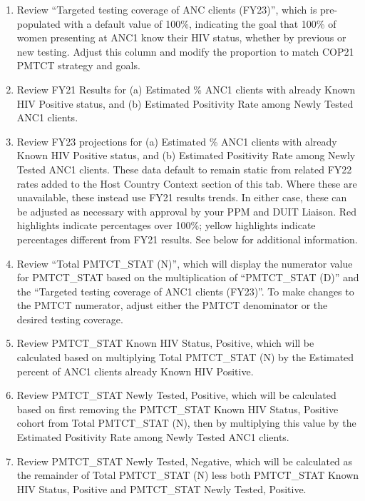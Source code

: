 \documentclass[
  openany]{book}
\begin{document}
\begin{enumerate}
\def\labelenumi{\arabic{enumi}.}
\item
  Review ``Targeted testing coverage of ANC clients (FY23)'', which is
  pre-populated with a default value of 100\%, indicating the goal that
  100\% of women presenting at ANC1 know their HIV status, whether by
  previous or new testing. Adjust this column and modify the
  proportion to match COP21 PMTCT strategy and goals.
\item
  Review FY21 Results for (a) Estimated \% ANC1 clients with already
  Known HIV Positive status, and (b) Estimated Positivity Rate among
  Newly Tested ANC1 clients.
\item
  Review FY23 projections for (a) Estimated \% ANC1 clients with
  already Known HIV Positive status, and (b) Estimated Positivity Rate
  among Newly Tested ANC1 clients. These data default to remain static
  from related FY22 rates added to the Host Country Context section of
  this tab. Where these are unavailable, these instead use FY21
  results trends. In either case, these can be adjusted as necessary
  with approval by your PPM and DUIT Liaison. Red highlights indicate
  percentages over 100\%; yellow highlights indicate percentages
  different from FY21 results. See below for additional information.
\item
  Review ``Total PMTCT\_STAT (N)'', which will display the numerator
  value for PMTCT\_STAT based on the multiplication of ``PMTCT\_STAT (D)''
  and the ``Targeted testing coverage of ANC1 clients (FY23)''. To make
  changes to the PMTCT numerator, adjust either the PMTCT denominator
  or the desired testing coverage.
\item
  Review PMTCT\_STAT Known HIV Status, Positive, which will be
  calculated based on multiplying Total PMTCT\_STAT (N) by the
  Estimated percent of ANC1 clients already Known HIV Positive.
\item
  Review PMTCT\_STAT Newly Tested, Positive, which will be calculated
  based on first removing the PMTCT\_STAT Known HIV Status, Positive
  cohort from Total PMTCT\_STAT (N), then by multiplying this value by
  the Estimated Positivity Rate among Newly Tested ANC1 clients.
\item
  Review PMTCT\_STAT Newly Tested, Negative, which will be calculated
  as the remainder of Total PMTCT\_STAT (N) less both PMTCT\_STAT Known
  HIV Status, Positive and PMTCT\_STAT Newly Tested, Positive.
\end{enumerate}
\end{document}

